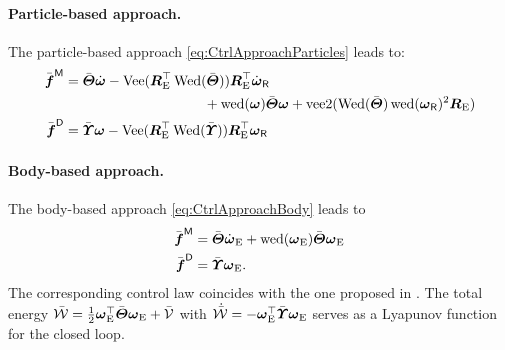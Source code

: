 \paragraph{Particle-based approach.}
The particle-based approach \eqref{eq:CtrlApproachParticles} leads to:
\begin{subequations}
\begin{align}
 \genForceInertiaC &= \Jc \wdot - \veeMatOp(\RE^\top \wedMatOp(\Jc)) \RE^\top \wRd
\nonumber\\
 &\hspace{10em}
 + \wedOp(\w) \Jc \w + \veeTwoOp(\wedMatOp(\Jc)\wedOp(\wR)^2\RE)
\\
 \genForceDissC &= \sigc \w - \veeMatOp(\RE^\top \wedMatOp(\sigc)) \RE^\top \wR
\end{align} 
\end{subequations}

\paragraph{Body-based approach.}
The body-based approach \eqref{eq:CtrlApproachBody} leads to 
\begin{subequations}
\begin{align}
 \bar{\boldsymbol{f}}^{\mathsf{M}} &= \bar{\boldsymbol{\varTheta}} \dot{\boldsymbol{\omega}}_{\mathrm{E}} + \operatorname{wed}(\boldsymbol{\omega}_{\mathrm{E}}) \bar{\boldsymbol{\varTheta}} \boldsymbol{\omega}_{\mathrm{E}}
\\
 \bar{\boldsymbol{f}}^{\mathsf{D}} &= \bar{\boldsymbol{\varUpsilon}} \boldsymbol{\omega}_{\mathrm{E}}.
\end{align} 
\end{subequations}
The corresponding control law coincides with the one proposed in \cite{Koditschek:TotalEnergy}.
The total energy $\bar{\mathcal{W}} = \tfrac{1}{2} \boldsymbol{\omega}_{\mathrm{E}}^\top \bar{\boldsymbol{\varTheta}} \boldsymbol{\omega}_{\mathrm{E}} + \bar{\mathcal{V}}$ with $\dot{\bar{\mathcal{W}}} = -\boldsymbol{\omega}_{\mathrm{E}}^\top \bar{\boldsymbol{\varUpsilon}} \boldsymbol{\omega}_{\mathrm{E}}$ serves as a Lyapunov function for the closed loop.


